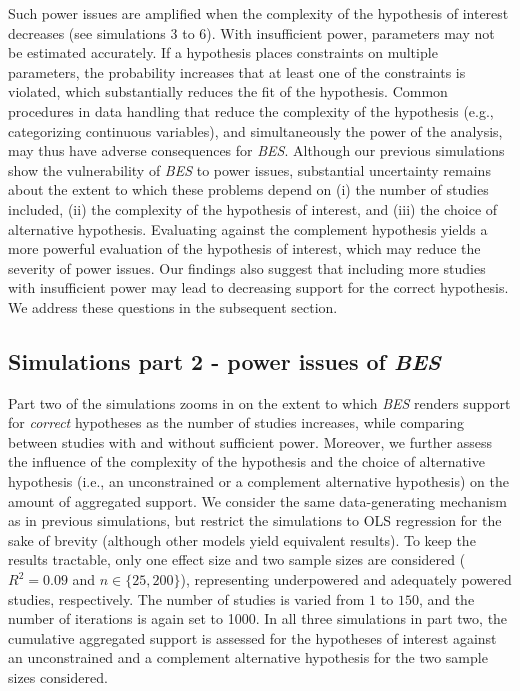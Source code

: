 \documentclass[
  authoryear,
  preprint,
  5p,
  twocolumn]{elsarticle}
\begin{document}
Such power issues are amplified when the complexity of the hypothesis of
interest decreases (see simulations 3 to 6). With insufficient power,
parameters may not be estimated accurately. If a hypothesis places
constraints on multiple parameters, the probability increases that at
least one of the constraints is violated, which substantially reduces
the fit of the hypothesis. Common procedures in data handling that
reduce the complexity of the hypothesis (e.g., categorizing continuous
variables), and simultaneously the power of the analysis, may thus have
adverse consequences for \emph{BES}. Although our previous simulations
show the vulnerability of \emph{BES} to power issues, substantial
uncertainty remains about the extent to which these problems depend on
(i) the number of studies included, (ii) the complexity of the
hypothesis of interest, and (iii) the choice of alternative hypothesis.
Evaluating against the complement hypothesis yields a more powerful
evaluation of the hypothesis of interest, which may reduce the severity
of power issues. Our findings also suggest that including more studies
with insufficient power may lead to decreasing support for the correct
hypothesis. We address these questions in the subsequent section.

\hypertarget{simulations-part-2---power-issues-of-bes}{%
\subsection{\texorpdfstring{Simulations part 2 - power issues of
\emph{BES}}{Simulations part 2 - power issues of BES}}\label{simulations-part-2---power-issues-of-bes}}

Part two of the simulations zooms in on the extent to which \emph{BES}
renders support for \emph{correct} hypotheses as the number of studies
increases, while comparing between studies with and without sufficient
power. Moreover, we further assess the influence of the complexity of
the hypothesis and the choice of alternative hypothesis (i.e., an
unconstrained or a complement alternative hypothesis) on the amount of
aggregated support. We consider the same data-generating mechanism as in
previous simulations, but restrict the simulations to OLS regression for
the sake of brevity (although other models yield equivalent results). To
keep the results tractable, only one effect size and two sample sizes
are considered (\(R^2 = 0.09\) and \(n \in \{25, 200\}\)), representing
underpowered and adequately powered studies, respectively. The number of
studies is varied from \(1\) to \(150\), and the number of iterations is
again set to 1000. In all three simulations in part two, the cumulative
aggregated support is assessed for the hypotheses of interest against an
unconstrained and a complement alternative hypothesis for the two sample
sizes considered.
\end{document}
